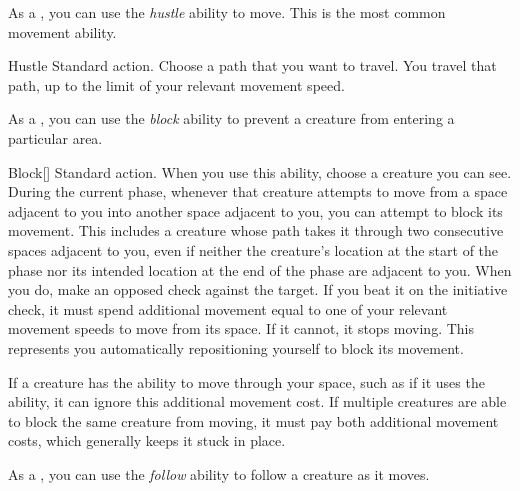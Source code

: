         \label{Hustle} As a , you can use the \textit{hustle} ability to move.
        This is the most common movement ability.

        \begin{activeability}{Hustle}
                \abilityusagetime Standard action.
            \rankline
            Choose a path that you want to travel.
            You travel that path, up to the limit of your relevant movement speed.
        \end{activeability}

        \label{Block} As a , you can use the \textit{block} ability to prevent a creature from entering a particular area.

        \begin{activeability}{Block}[]
            \abilityusagetime Standard action.
            \rankline
            When you use this ability, choose a creature you can see.
            During the current phase, whenever that creature attempts to move from a space adjacent to you into another space adjacent to you, you can attempt to block its movement.
            This includes a creature whose path takes it through two consecutive spaces adjacent to you, even if neither the creature's location at the start of the phase nor its intended location at the end of the phase are adjacent to you.
            When you do, make an opposed  check against the target.
            If you beat it on the initiative check, it must spend additional movement equal to one of your relevant movement speeds to move from its space.
            If it cannot, it stops moving.
            This represents you automatically repositioning yourself to block its movement.

            If a creature has the ability to move through your space, such as if it uses the  ability, it can ignore this additional movement cost.
            If multiple creatures are able to block the same creature from moving, it must pay both additional movement costs, which generally keeps it stuck in place.
        \end{activeability}

        \label{Follow} As a , you can use the \textit{follow} ability to follow a creature as it moves.

